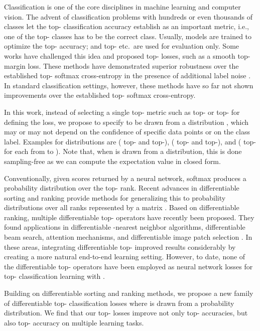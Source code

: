 \documentclass{article}
\newcommand{\revC}[1]{{#1}}
\begin{document}
Classification is one of the core disciplines in machine learning and computer vision.
The advent of classification problems with hundreds or even thousands of classes let the top- classification accuracy establish as an important metric, i.e., one of the top- classes has to be the correct class.
Usually, models are trained to optimize the top- accuracy; and top- etc.~are used for evaluation only.
Some works \citep{lapin2016loss,berrada2018smooth} have challenged this idea and proposed top- losses, such as a smooth top- margin loss.
These methods have demonstrated superior robustness over the established top- softmax cross-entropy in the presence of additional label noise \citep{berrada2018smooth}.
In standard classification settings, however, these methods have so far not shown improvements over the established top- softmax cross-entropy.

In this work, instead of selecting a single top- metric such as top- or top- for defining the loss,
we propose to specify  to be drawn from a distribution , which may or may not depend on the confidence of specific data points or on the class label.
Examples for distributions  are  ( top- and  top-),  ( top- and  top-), and  ( top- for each  from  to ).
\revC{Note that, when  is drawn from a distribution, this is done sampling-free as we can compute the expectation value in closed form.} 

Conventionally, given scores returned by a neural network, softmax produces a probability distribution over the top- rank.
Recent advances in differentiable sorting and ranking \citep{Grover2019-NeuralSort, prillo2020softsort, Cuturi2019-SortingOT, Petersen2021-diffsort} provide methods for generalizing this to  probability distributions over all ranks represented by a matrix .
Based on differentiable ranking, multiple differentiable top- operators have recently been proposed.
They found applications in differentiable -nearest neighbor algorithms, differentiable beam search, attention mechanisms, and differentiable image patch selection \citep{cordonnier2021differentiable}.
In these areas, integrating differentiable top- improved results considerably by creating a more natural end-to-end learning setting.
However, to date, none of the differentiable top- operators have been employed as neural network losses for top- classification learning with .

Building on differentiable sorting and ranking methods, we propose a new family of differentiable top- classification losses where  is drawn from a probability distribution.
We find that our top- losses improve not only top- accuracies, but 
also top- accuracy on multiple learning tasks.
\end{document}
